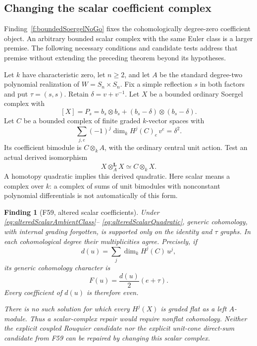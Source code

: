 \documentclass[11pt,a4paper]{article}
\newcommand{\fid}[1]{\textsf{#1}}\newcommand{\gate}[1]{\textsf{#1}}
\theoremstyle{named}\newtheorem{finding}{Finding}[section]
\theoremstyle{definition}\newtheorem{definition}[finding]{Definition}
\theoremstyle{remark}\newtheorem{remark}[finding]{Remark}
\begin{document}
\subsection{Changing the scalar coefficient complex}

Finding~\ref{f:boundedSoergelNoGo} fixes the cohomologically
degree-zero coefficient object. An arbitrary bounded scalar
complex with the same Euler class is a larger premise. The
following necessary conditions and candidate tests address
that premise without extending the preceding theorem beyond
its hypotheses.

Let \(k\) have characteristic zero, let \(n\geq2\), and let
\(A\) be the standard degree-two polynomial realization of
\(W=S_n\times S_n\). Fix a simple reflection \(s\) in both
factors and put \(\tau=(s,s)\). Retain
\(\delta=v+v^{-1}\).
Let \(X\) be a bounded ordinary Soergel complex with
\begin{equation}\label{eq:alteredScalarAmbientClass}
 [X]=P_s=b_s\otimes b_s+
                    (b_s-\delta)\otimes(b_s-\delta).
\end{equation}
Let \(C\) be a bounded complex of finite graded
\(k\)-vector spaces with
\begin{equation}\label{eq:alteredScalarEuler}
 \sum_{j,e}(-1)^j\dim_k H^j(C)_e\,v^e=\delta^2.
\end{equation}
Its coefficient bimodule is \(C\otimes_k A\), with the
ordinary central unit action. Test an actual derived
isomorphism
\begin{equation}\label{eq:alteredScalarQuadratic}
 X\otimes_A^{\mathbf L}X\simeq C\otimes_k X.
\end{equation}
A homotopy quadratic implies this derived quadratic.
Here scalar means a complex over \(k\): a complex of sums
of unit bimodules with nonconstant polynomial differentials
is not automatically of this form.

\begin{finding}[\fid{F59}, altered scalar coefficients]
\label{f:alteredScalarSoergel}
Under \eqref{eq:alteredScalarAmbientClass}--
\eqref{eq:alteredScalarQuadratic}, generic cohomology,
with internal grading forgotten, is supported only on the
identity and \(\tau\) graphs. In each cohomological degree
their multiplicities agree. Precisely, if
\[
 d(u)=\sum_j\dim_k H^j(C)\,u^j,
\]
its generic cohomology character is
\begin{equation}\label{eq:alteredScalarUniformGraphs}
                    F(u)=\frac{d(u)}2(e+\tau).
\end{equation}
Every coefficient of \(d(u)\) is therefore even.

There is no such solution for which every \(H^j(X)\) is
graded flat as a left \(A\)-module. Thus a scalar-complex
repair would require nonflat cohomology. Neither the
explicit coupled Rouquier candidate nor the explicit
unit-cone direct-sum candidate from \fid{F59} can be
repaired by changing this scalar complex.
\end{finding}
\end{document}
